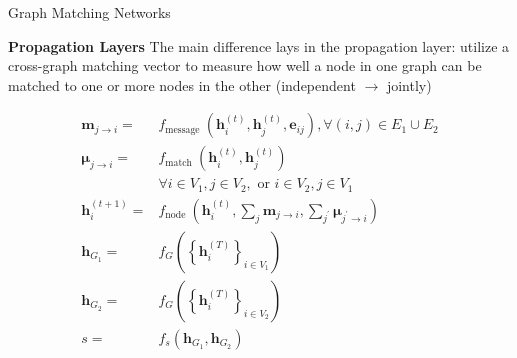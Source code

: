 \documentclass{beamer}
\begin{document}
\begin{frame}{Graph Matching Networks}

\textbf{Propagation Layers}
The main difference lays in the propagation layer: utilize a cross-graph matching vector to measure how well a node in one graph can be matched to one or more nodes in the other (independent $\rightarrow$ jointly) \\

\begin{tiny}
\begin{equation*}
\begin{aligned}
\mathbf{m}_{j \rightarrow i}=& f_{\text {message }}\left(\mathbf{h}_{i}^{(t)}, \mathbf{h}_{j}^{(t)}, \mathbf{e}_{i j}\right), \forall(i, j) \in E_{1} \cup E_{2} \\
\boldsymbol{\mu}_{j \rightarrow i}=& f_{\text {match }}\left(\mathbf{h}_{i}^{(t)}, \mathbf{h}_{j}^{(t)}\right) \\
& \forall i \in V_{1}, j \in V_{2}, \text { or } i \in V_{2}, j \in V_{1} \\
\mathbf{h}_{i}^{(t+1)}=& f_{\text {node }}\left(\mathbf{h}_{i}^{(t)}, \sum_{j} \mathbf{m}_{j \rightarrow i}, \sum_{j^{\prime}} \boldsymbol{\mu}_{j^{\prime} \rightarrow i}\right) \\
\mathbf{h}_{G_{1}}=& f_{G}\left(\left\{\mathbf{h}_{i}^{(T)}\right\}_{i \in V_{1}}\right) \\
\mathbf{h}_{G_{2}}=& f_{G}\left(\left\{\mathbf{h}_{i}^{(T)}\right\}_{i \in V_{2}}\right) \\
s=& f_{s}\left(\mathbf{h}_{G_{1}}, \mathbf{h}_{G_{2}}\right)
\end{aligned}
\end{equation*}
\end{tiny}
\end{frame}
\end{document}
